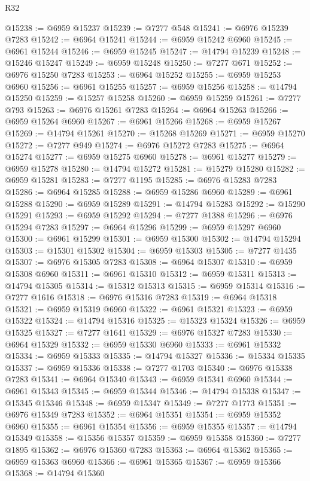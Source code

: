 \begin{lexlean}{R32}
\begin{coremodule}
@15238 := @6959 @15237
@15239 := @7277 @548
@15241 := @6976 @15239 @7283
@15242 := @6964 @15241
@15244 := @6959 @15242 @6960
@15245 := @6961 @15244
@15246 := @6959 @15245
@15247 := @14794 @15239
@15248 := @15246 @15247
@15249 := @6959 @15248
@15250 := @7277 @671
@15252 := @6976 @15250 @7283
@15253 := @6964 @15252
@15255 := @6959 @15253 @6960
@15256 := @6961 @15255
@15257 := @6959 @15256
@15258 := @14794 @15250
@15259 := @15257 @15258
@15260 := @6959 @15259
@15261 := @7277 @793
@15263 := @6976 @15261 @7283
@15264 := @6964 @15263
@15266 := @6959 @15264 @6960
@15267 := @6961 @15266
@15268 := @6959 @15267
@15269 := @14794 @15261
@15270 := @15268 @15269
@15271 := @6959 @15270
@15272 := @7277 @949
@15274 := @6976 @15272 @7283
@15275 := @6964 @15274
@15277 := @6959 @15275 @6960
@15278 := @6961 @15277
@15279 := @6959 @15278
@15280 := @14794 @15272
@15281 := @15279 @15280
@15282 := @6959 @15281
@15283 := @7277 @1195
@15285 := @6976 @15283 @7283
@15286 := @6964 @15285
@15288 := @6959 @15286 @6960
@15289 := @6961 @15288
@15290 := @6959 @15289
@15291 := @14794 @15283
@15292 := @15290 @15291
@15293 := @6959 @15292
@15294 := @7277 @1388
@15296 := @6976 @15294 @7283
@15297 := @6964 @15296
@15299 := @6959 @15297 @6960
@15300 := @6961 @15299
@15301 := @6959 @15300
@15302 := @14794 @15294
@15303 := @15301 @15302
@15304 := @6959 @15303
@15305 := @7277 @1435
@15307 := @6976 @15305 @7283
@15308 := @6964 @15307
@15310 := @6959 @15308 @6960
@15311 := @6961 @15310
@15312 := @6959 @15311
@15313 := @14794 @15305
@15314 := @15312 @15313
@15315 := @6959 @15314
@15316 := @7277 @1616
@15318 := @6976 @15316 @7283
@15319 := @6964 @15318
@15321 := @6959 @15319 @6960
@15322 := @6961 @15321
@15323 := @6959 @15322
@15324 := @14794 @15316
@15325 := @15323 @15324
@15326 := @6959 @15325
@15327 := @7277 @1641
@15329 := @6976 @15327 @7283
@15330 := @6964 @15329
@15332 := @6959 @15330 @6960
@15333 := @6961 @15332
@15334 := @6959 @15333
@15335 := @14794 @15327
@15336 := @15334 @15335
@15337 := @6959 @15336
@15338 := @7277 @1703
@15340 := @6976 @15338 @7283
@15341 := @6964 @15340
@15343 := @6959 @15341 @6960
@15344 := @6961 @15343
@15345 := @6959 @15344
@15346 := @14794 @15338
@15347 := @15345 @15346
@15348 := @6959 @15347
@15349 := @7277 @1773
@15351 := @6976 @15349 @7283
@15352 := @6964 @15351
@15354 := @6959 @15352 @6960
@15355 := @6961 @15354
@15356 := @6959 @15355
@15357 := @14794 @15349
@15358 := @15356 @15357
@15359 := @6959 @15358
@15360 := @7277 @1895
@15362 := @6976 @15360 @7283
@15363 := @6964 @15362
@15365 := @6959 @15363 @6960
@15366 := @6961 @15365
@15367 := @6959 @15366
@15368 := @14794 @15360

\end{coremodule}
\end{lexlean}
